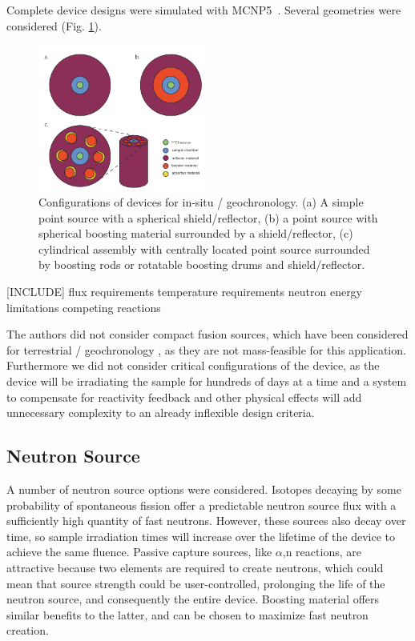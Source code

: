 \documentclass{mc2015}
\begin{document}
Complete device designs were simulated with MCNP5~\cite{brown_mcnp_2002}. Several geometries were considered (Fig. \ref{fig:geometries}). 

\begin{figure}[H]
  \centering
  \includegraphics[width=0.5\textwidth]{Geometries.png}
  \caption{Configurations of devices for in-situ / geochronology. (a) A simple point source with a spherical shield/reflector, (b) a point source with spherical boosting material surrounded by a shield/reflector, (c) cylindrical assembly with centrally located point source surrounded by boosting rods or rotatable boosting drums and shield/reflector.}
  \label{fig:geometries}
\end{figure}

[INCLUDE] flux requirements
temperature requirements
neutron energy limitations
competing reactions


The authors did not consider compact fusion sources, which have been considered for terrestrial / geochronology \cite{renne_application_2005}, as they are not mass-feasible for this application. Furthermore we did not consider critical configurations of the device, as the device will be irradiating the sample for hundreds of days at a time and a system to compensate for reactivity feedback and other physical effects will add unnecessary complexity to an already inflexible design criteria. 

\subsection{Neutron Source}

A number of neutron source options were considered. Isotopes decaying by some probability of spontaneous fission offer a predictable neutron source flux with a sufficiently high quantity of fast neutrons. However, these sources also decay over time, so sample irradiation times will increase over the lifetime of the device to achieve the same fluence. Passive capture sources, like $\alpha$,n reactions, are attractive because two elements are required to create neutrons, which could mean that source strength could be user-controlled, prolonging the life of the neutron source, and consequently the entire device. Boosting material offers similar benefits to the latter, and can be chosen to maximize fast neutron creation.   
\end{document}
